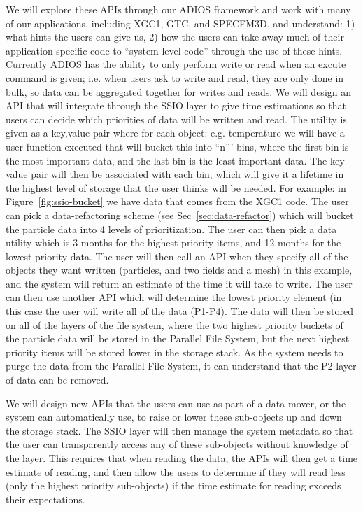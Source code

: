 %
We will explore these APIs through our ADIOS framework and work with many of our applications, 
including XGC1, GTC, and SPECFM3D, and understand: 1) what hints the users can give us, 2) how
the users can take away much of their application specific code to ``system level code'' through the use of these hints.
Currently ADIOS has the ability to only perform write or read when an excute command is given; i.e. when users 
ask to write and read, they are only done in  bulk, so data can be aggregated together for writes and reads. We will
design an API that will integrate through the SSIO layer to give time estimations so that users can decide 
which priorities of data will be written and read. The utility is given as a key,value pair where for each object: e.g. temperature
we will have a user function executed that will bucket this into ``n''' bins, where the first bin is the most important data, and the
last bin is the least important data. The key value pair will then be associated with each bin, which will give it a lifetime in the highest level
of storage that the user thinks will be needed. For example: in Figure~\ref{fig:ssio-bucket} we have data that comes from the XGC1 code.
The user can pick a data-refactoring scheme (see Sec~\ref{sec:data-refactor}) which will bucket the particle data into 4 levels of prioritization.
The user can then pick a data utility which is 3 months for the highest priority items, and 12 months for the lowest priority data. 
The user will then call an API when they specify all of the objects they want written (particles, and two fields and a mesh) in this example, and
the system will return an estimate of the time it will take to write. The user can then use another API which will determine the lowest priority
element (in this case the user will write all of the data (P1-P4). The data will then be stored on all of the layers of the file system, where the
two highest priority buckets of the particle data will be stored in the Parallel File System, but the next  highest priority items will be stored
lower in the storage stack. As the system needs to purge the data from the Parallel File System, it can understand that the P2 layer of
data can be removed. 
%

We will design new APIs that the users can use as part of a data mover, or the system can automatically use, to raise or lower these sub-objects
up and down the storage stack. The SSIO layer will then manage the system metadata so that the user can transparently access any of these
sub-objects without knowledge of the layer. This requires that when reading the data, the APIs will then get a time estimate of reading, and then
allow the users to determine if they will read less (only the highest priority sub-objects) if the time estimate for reading exceeds their expectations.
%

